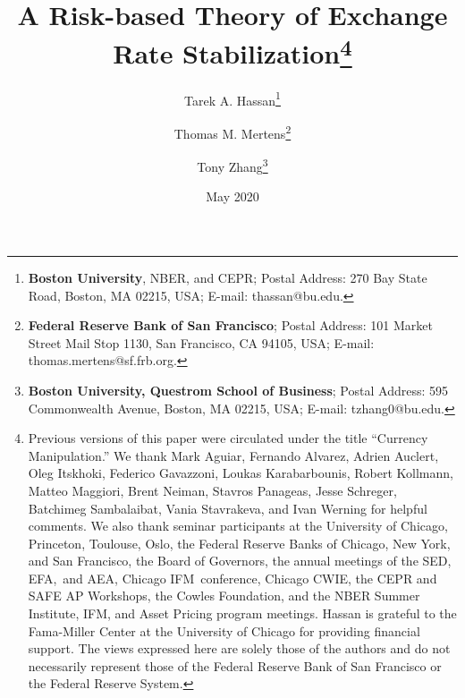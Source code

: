 \documentclass[12pt,letter]{article}
\theoremstyle{break} \theorembodyfont{\normalfont\itshape}
\theoremstyle{break}
\theoremstyle{break} \theorembodyfont{\normalfont\itshape}
\theoremstyle{break} \theorembodyfont{\normalfont\itshape}
\begin{document}
\author{Tarek A. Hassan\thanks{\textbf{Boston University}, NBER, and
    CEPR; Postal Address: 270 Bay State Road, Boston, MA 02215, USA;
    E-mail: thassan@bu.edu.} \and Thomas M. Mertens\thanks{%
    \textbf{Federal Reserve Bank of San Francisco}; Postal Address:
    101 Market Street Mail Stop 1130, San Francisco, CA 94105, USA;
    E-mail: thomas.mertens@sf.frb.org.} \and Tony
  Zhang\thanks{\textbf{%
      Boston University, Questrom School of Business}; Postal Address:
    595 Commonwealth Avenue, Boston, MA 02215, USA; E-mail:
    tzhang0@bu.edu.} } \title{A Risk-based Theory of Exchange Rate
  Stabilization\thanks{Previous versions of this paper were circulated under the title ``Currency Manipulation.'' We thank Mark Aguiar, Fernando Alvarez, Adrien
    Auclert, Oleg Itskhoki, Federico Gavazzoni, Loukas Karabarbounis,
    Robert Kollmann, Matteo Maggiori, Brent Neiman, Stavros Panageas,
    Jesse Schreger, Batchimeg Sambalaibat, Vania Stavrakeva, and Ivan
    Werning for helpful comments. We also thank seminar participants
    at the University of Chicago, Princeton, Toulouse, Oslo, the
    Federal Reserve Banks of Chicago, New York, and San Francisco, the
    Board of Governors, the annual meetings of the SED, EFA,\ and AEA,
    Chicago IFM\ conference, Chicago CWIE, the CEPR and SAFE AP
    Workshops, the Cowles Foundation, and the NBER Summer Institute,
    IFM, and Asset Pricing program meetings. Hassan is grateful to the
    Fama-Miller Center at the University of Chicago for providing
    financial support. The views expressed here are solely those of
    the authors and do not necessarily represent those of the Federal
    Reserve Bank of San Francisco or the Federal Reserve System.}}
\date{ \bigskip May 2020}
\maketitle


\thispagestyle{empty}


\vspace{-0.7cm}



\end{document}
